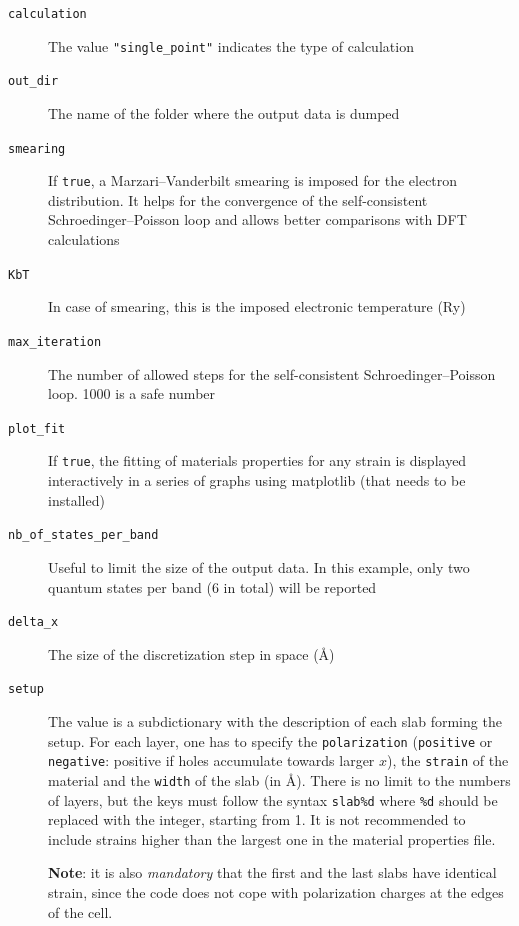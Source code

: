 \documentclass[a4paper,12pt]{article}
\newcommand{\angstrom}{\textup{\AA}}
\begin{document}
\begin{description}
\item[\texttt{calculation}] The value \texttt{"single\_point"} indicates the type of calculation

\item[\texttt{out\_dir}] The name of the folder where the output data is dumped

\item[\texttt{smearing}] If \texttt{true}, a Marzari--Vanderbilt smearing is imposed for the electron distribution. It helps for the convergence of the self-consistent Schroedinger--Poisson loop and allows better comparisons with DFT calculations

\item[\texttt{KbT}] In case of smearing, this is the imposed electronic temperature (Ry)

\item[\texttt{max\_iteration}] The number of allowed steps for the self-consistent Schroedinger--Poisson loop. 1000 is a safe number

\item[\texttt{plot\_fit}] If \texttt{true}, the fitting of materials properties for any strain is displayed interactively in a series of graphs using matplotlib (that needs to be installed)

\item[\texttt{nb\_of\_states\_per\_band}] Useful to limit the size of the output data. In this example, only two quantum states per band (6 in total) will be reported

\item[\texttt{delta\_x}] The size of the discretization step in space (\angstrom)

\item[\texttt{setup}] The value is a subdictionary with the description of each slab forming the setup. For each layer, one has to specify the \texttt{polarization} (\texttt{positive} or \texttt{negative}: positive if holes accumulate towards larger $x$), the \texttt{strain} of the material and the \texttt{width} of the slab (in \angstrom). There is no limit to the numbers of layers, but the keys must follow the syntax \texttt{slab\%d} where \texttt{\%d} should be replaced with the integer, starting from 1. It is not recommended to include strains higher than the largest one in the material properties file. 

\textbf{Note}: it is also \emph{mandatory} that the first and the last slabs have identical strain, since the code does not cope with polarization charges at the edges of the cell.
\end{description}
\end{document}
